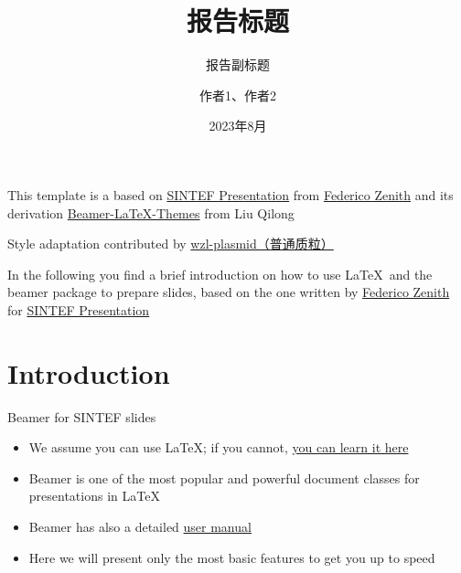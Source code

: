 \documentclass{beamer}
\title{报告标题}
\subtitle{报告副标题}
\author{作者1、作者2}
\date{2023年8月}
\newcommand{\hrefcol}[2]{\textcolor{cyan}{\href{#1}{#2}}}
\begin{document}
\maketitle

\begin{frame}

This template is a based on \hrefcol{https://www.overleaf.com/latex/templates/sintef-presentation/jhbhdffczpnx}{SINTEF Presentation} from \hrefcol{mailto:federico.zenith@sintef.no}{Federico Zenith} and its derivation \hrefcol{https://github.com/TOB-KNPOB/Beamer-LaTeX-Themes}{Beamer-LaTeX-Themes} from Liu Qilong

\vspace{\baselineskip}

 Style adaptation contributed by \hrefcol{https://github.com/wzl-plasmid}{wzl-plasmid（普通质粒）}

\vspace{\baselineskip}

In the following you find a brief introduction on how to use \LaTeX\ and the beamer package to prepare slides, based on the one written by \hrefcol{mailto:federico.zenith@sintef.no}{Federico Zenith} for \hrefcol{https://www.overleaf.com/latex/templates/sintef-presentation/jhbhdffczpnx}{SINTEF Presentation}


\end{frame}

\section{Introduction}

\begin{frame}{Beamer for SINTEF slides}
\begin{itemize}
\item We assume you can use \LaTeX; if you cannot,
\hrefcol{http://en.wikibooks.org/wiki/LaTeX/}{you can learn it here}
\item Beamer is one of the most popular and powerful document
classes for presentations in \LaTeX
\item Beamer has also a detailed
\hrefcol{http://www.ctan.org/tex-archive/macros/latex/contrib/beamer/doc/beameruserguide.pdf}{user
 manual}
\item Here we will present only the most basic features to get you up to speed
\end{itemize}
\end{frame}
\end{document}
